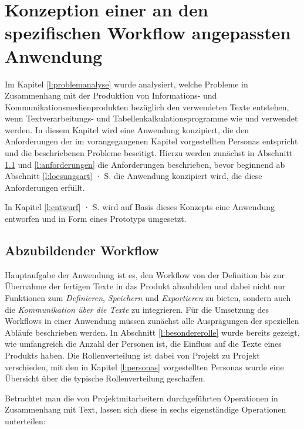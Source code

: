 \section{Konzeption einer an den spezifischen Workflow angepassten Anwendung}\label{l:konzeption}

Im Kapitel \ref{l:problemanalyse} wurde analysiert, welche Probleme in Zusammenhang mit der Produktion von Informations- und Kommunikationsmedienprodukten bezüglich den verwendeten Texte entstehen, wenn Textverarbeitungs- und Tabellenkalkulationsprogramme wie  und  verwendet werden. In diesem Kapitel wird eine Anwendung konzipiert, die den Anforderungen der im vorangegangenen Kapitel vorgestellten Personas entspricht und die beschriebenen Probleme beseitigt. Hierzu werden zunächst in Abschnitt \ref{l:workflow} und \ref{l:anforderungen} die Anforderungen beschrieben, bevor beginnend ab Abschnitt \ref{l:loesungsart} · S.\pageref{l:loesungsart} die Anwendung konzipiert wird, die diese Anforderungen erfüllt. 

\bigskip

In Kapitel \ref{l:entwurf} · S.\pageref{l:entwurf} wird auf Basis dieses Konzepts eine Anwendung entworfen und in Form eines Prototyps umgesetzt.

\pagebreak

\subsection{Abzubildender Workflow}\label{l:workflow}

Hauptaufgabe der Anwendung ist es, den Workflow von der Definition bis zur Übernahme der fertigen Texte in das Produkt abzubilden und dabei nicht nur Funktionen zum \emph{Definieren}, \emph{Speichern} und \emph{Exportieren} zu bieten, sondern auch die \emph{Kommunikation über die Texte} zu integrieren. Für die Umsetzung des Workflows in einer Anwendung müssen zunächst alle Ausprägungen der speziellen Abläufe beschrieben werden. In Abschnitt \ref{l:besondererolle} wurde bereits gezeigt, wie umfangreich die Anzahl der Personen ist, die Einfluss auf die Texte eines Produkts haben. Die Rollenverteilung ist dabei von Projekt zu Projekt verschieden, mit den in Kapitel \ref{l:personas} vorgestellten Personas wurde eine Übersicht über die typische Rollenverteilung geschaffen. 

\bigskip

Betrachtet man die von Projektmitarbeitern durchgeführten Operationen in Zusammenhang mit Text, lassen sich diese in sechs eigenständige Operationen unterteilen:

